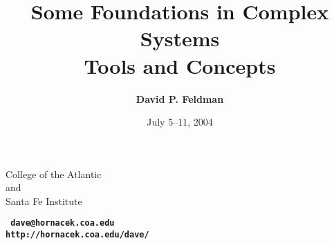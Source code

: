 \documentclass[%
  color,
  epsf,
  url,
  amssymb,
  semhelv,%
  portrait,%
  semlayer%
  ]{seminar}
\title{ {\bf Some Foundations in Complex Systems}\\ Tools and
Concepts}
\author{ {\bf David P. Feldman} }
\date{July 5--11, 2004}
\begin{document}
\maketitle    %
\begin{center}
{\large
College of the Atlantic \\ and \\
Santa Fe Institute} \\
\end{center}
\begin{center}
{\large \tt \bf
dave@hornacek.coa.edu \\
\smallskip
http://hornacek.coa.edu/dave/ }\\
\end{center}


\begin{slide}
  \ifslidesonly              %
    \maketitle
    \addtocounter{slide}{-1}
  \fi
\end{slide}
\end{document}
